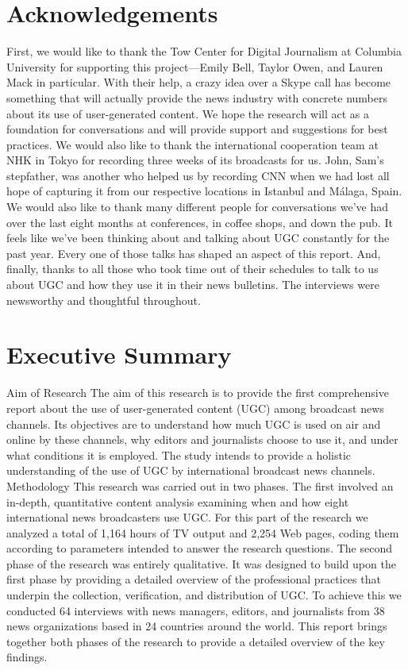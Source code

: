 \chapter{Acknowledgements}
First, we would like to thank the Tow Center for Digital Journalism at Columbia University for supporting this project—Emily Bell, Taylor Owen, and Lauren Mack in particular. With their help, a crazy idea over a Skype call has become something that will actually provide the news industry with concrete numbers about its use of user-generated content. We hope the research will act as a foundation for conversations and will provide support and suggestions for best practices. We would also like to thank the international cooperation team at NHK in Tokyo for recording three weeks of its broadcasts for us. John, Sam's stepfather, was another who helped us by recording CNN when we had lost all hope of capturing it from our respective locations in Istanbul and Málaga, Spain. We would also like to thank many different people for conversations we've had over the last eight months at conferences, in coffee shops, and down the pub. It feels like we've been thinking about and talking about UGC constantly for the past year. Every one of those talks has shaped an aspect of this report. And, finally, thanks to all those who took time out of their schedules to talk to us about UGC and how they use it in their news bulletins. The interviews were newsworthy and thoughtful throughout.

\chapter{Executive Summary}
Aim of Research
The aim of this research is to provide the first comprehensive report about the use of user-generated content (UGC) among broadcast news channels. Its objectives are to understand how much UGC is used on air and online by these channels, why editors and journalists choose to use it, and under what conditions it is employed. The study intends to provide a holistic understanding of the use of UGC by international broadcast news channels.
Methodology
This research was carried out in two phases. The first involved an in-depth, quantitative content analysis examining when and how eight international news broadcasters use UGC. For this part of the research we analyzed a total of 1,164 hours of TV output and 2,254 Web pages, coding them according to parameters intended to answer the research questions. The second phase of the research was entirely qualitative. It was designed to build upon the first phase by providing a detailed overview of the professional practices that underpin the collection, verification, and distribution of UGC. To achieve this we conducted 64 interviews with news managers, editors, and journalists from 38 news organizations based in 24 countries around the world. This report brings together both phases of the research to provide a detailed overview of the key findings.

